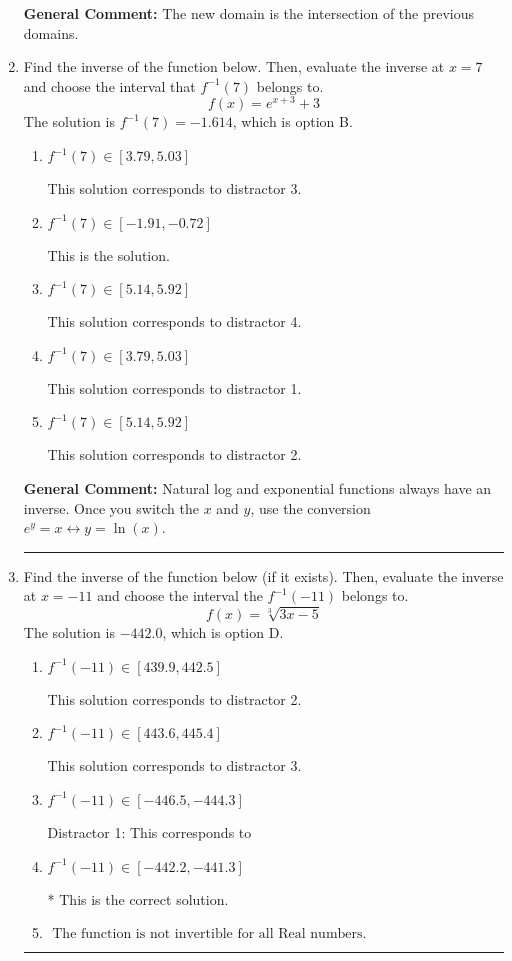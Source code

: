 \documentclass{extbook}[14pt]
\newcommand{\litem}[1]{\item #1

\rule{\textwidth}{0.4pt}}
\begin{document}
\begin{enumerate}
{\begin{enumerate}[label=\Alph*.]
\end{enumerate}

\textbf{General Comment:} The new domain is the intersection of the previous domains.
}
\litem{
Find the inverse of the function below. Then, evaluate the inverse at $x = 7$ and choose the interval that $f^{-1}(7)$ belongs to.
\[ f(x) = e^{x+3}+3 \]
The solution is \( f^{-1}(7) = -1.614 \), which is option B.\begin{enumerate}[label=\Alph*.]
\item \( f^{-1}(7) \in [3.79, 5.03] \)

 This solution corresponds to distractor 3.
\item \( f^{-1}(7) \in [-1.91, -0.72] \)

 This is the solution.
\item \( f^{-1}(7) \in [5.14, 5.92] \)

 This solution corresponds to distractor 4.
\item \( f^{-1}(7) \in [3.79, 5.03] \)

 This solution corresponds to distractor 1.
\item \( f^{-1}(7) \in [5.14, 5.92] \)

 This solution corresponds to distractor 2.
\end{enumerate}

\textbf{General Comment:} Natural log and exponential functions always have an inverse. Once you switch the $x$ and $y$, use the conversion $ e^y = x \leftrightarrow y=\ln(x)$.
}
\litem{
Find the inverse of the function below (if it exists). Then, evaluate the inverse at $x = -11$ and choose the interval the $f^{-1}(-11)$ belongs to.
\[ f(x) = \sqrt[3]{3 x - 5} \]
The solution is \( -442.0 \), which is option D.\begin{enumerate}[label=\Alph*.]
\item \( f^{-1}(-11) \in [439.9, 442.5] \)

 This solution corresponds to distractor 2.
\item \( f^{-1}(-11) \in [443.6, 445.4] \)

 This solution corresponds to distractor 3.
\item \( f^{-1}(-11) \in [-446.5, -444.3] \)

 Distractor 1: This corresponds to 
\item \( f^{-1}(-11) \in [-442.2, -441.3] \)

* This is the correct solution.
\item \( \text{ The function is not invertible for all Real numbers. } \)


\end{enumerate}}
\end{enumerate}
\end{document}
